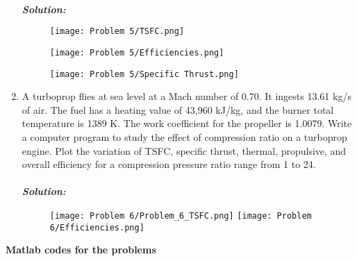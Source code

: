 \documentclass[]{article}
\theoremstyle{definition}
\begin{document}
\begin{enumerate}
\\
\emph{\textbf{Solution:}}
\begin{figure}[h]
\texttt{[image: Problem 5/TSFC.png]}
\centering
\end{figure}
\begin{figure}[h]
\texttt{[image: Problem 5/Efficiencies.png]}
\centering
\end{figure}
\begin{figure}[h]
\texttt{[image: Problem 5/Specific Thrust.png]}
\centering
\centering
\end{figure}

\newpage
\item
A turboprop flies at sea level at a Mach number of 0.70. It ingests 13.61 kg/s of air.
The fuel has a heating value of 43,960 kJ/kg, and the burner total temperature
is 1389 K. The work coefficient for the propeller is 1.0079. Write a computer program to study the effect of compression ratio on a turboprop engine. Plot the variation of TSFC, specific thrust, thermal, propulsive, and overall efficiency for a compression pressure ratio range from 1 to 24.\\
\\
\emph{\textbf{Solution:}}
\begin{figure}[h]
\texttt{[image: Problem 6/Problem\_6\_TSFC.png]}
\texttt{[image: Problem 6/Efficiencies.png]}
\centering
\end{figure}
\end{enumerate}
\newpage
\begin{center}
{\bf Matlab codes for the problems}
\end{center}
\end{document}
